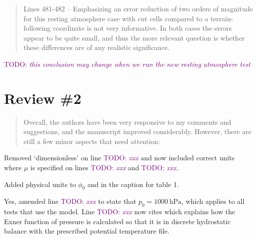 \documentclass{article}
\newcommand{\TODO}[1]{\textcolor{purple}{TODO: \emph{#1}}}
\begin{document}
\begin{quotation}
 Lines 481-482 – Emphasizing an error reduction of two orders of magnitude for this 
 resting atmosphere case with cut cells compared to a terrain-following coordinate is 
 not very informative. In both cases the errors appear to be quite small, and thus the 
 more relevant question is whether these differences are of any realistic significance. 
\end{quotation}
\TODO{this conclusion may change when we run the new resting atmosphere test}


\section*{Review \#2}
\begin{quotation}
Overall, the authors have been very responsive to my comments and suggestions, and the manuscript improved considerably.
However, there are still a few minor aspects that need attention:
\begin{comment}
\item From equation (7a) it is clear that the symbol mu needs a physical unit which is 1/s. The statement in line 195
that mu is dimensionless is therefore wrong and needs to be corrected.
\end{comment}
\end{quotation}
Removed `dimensionless' on line \TODO{xxx} and now included correct units where $\mu$ is specified on lines \TODO{xxx} and \TODO{xxx}.

\begin{quotation}
	\begin{comment}
	\item Line 241: $\phi$ is defined as the tracer density. Therefore, the definition of $\phi_0$ needs the physical unit \si{\kilogram\per\meter\cubed}
	\end{comment}
\end{quotation}
Added physical units to $\phi_0$ and in the caption for table 1.

\begin{quotation}
	\begin{comment}
	\item Page 18, test c): The initial conditions look incomplete. Please provide information about the initial density or pressure initialization. Do you assume that the pressure at z=0 m is 1000 hPa?
	\end{comment}
\end{quotation}
Yes, amended line \TODO{xxx} to state that $p_0 = \SI{1000}{\hecto\pascal}$, which applies to all tests that use the model.  Line \TODO{xxx} now cites \citet{weller-shahrokhi2014} which explains how the Exner function of pressure is calculated so that it is in discrete hydrostatic balance with the prescribed potential temperature file.
\end{document}
